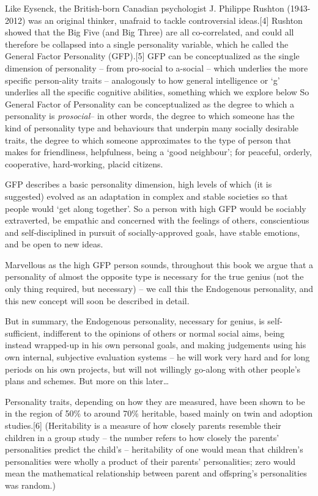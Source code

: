 \documentclass[
]{book}
\begin{document}
Like Eysenck, the British-born Canadian psychologist J. Philippe Rushton (1943-2012) was an original thinker, unafraid to tackle controversial ideas.{[}4{]} Rushton showed that the Big Five (and Big Three) are all co-correlated, and could all therefore be collapsed into a single personality variable, which he called the General Factor Personality (GFP).{[}5{]} GFP can be conceptualized as the single dimension of personality -- from pro-social to a-social -- which underlies the more specific person-ality traits -- analogously to how general intelligence or `g' underlies all the specific cognitive abilities, something which we explore below
So General Factor of Personality can be conceptualized as the degree to which a personality is \emph{prosocial}-- in other words, the degree to which someone has the kind of personality type and behaviours that underpin many socially desirable traits, the degree to which someone approximates to the type of person that makes for friendliness, helpfulness, being a `good neighbour'; for peaceful, orderly, cooperative, hard-working, placid citizens.

GFP describes a basic personality dimension, high levels of which (it is suggested) evolved as an adaptation in complex and stable societies so that people would `get along together'. So a person with high GFP would be sociably extraverted, be empathic and concerned with the feelings of others, conscientious and self-disciplined in pursuit of socially-approved goals, have stable emotions, and be open to new ideas.

Marvellous as the high GFP person sounds, throughout this book we argue that a personality of almost the opposite type is necessary for the true genius (not the only thing required, but necessary) -- we call this the Endogenous personality, and this new concept will soon be described in detail.

But in summary, the Endogenous personality, necessary for genius, is self-sufficient, indifferent to the opinions of others or normal social aims, being instead wrapped-up in his own personal goals, and making judgements using his own internal, subjective evaluation systems -- he will work very hard and for long periods on his own projects, but will not willingly go-along with other people's plans and schemes. But more on this later\ldots{}

Personality traits, depending on how they are measured, have been shown to be in the region of 50\% to around 70\% heritable, based mainly on twin and adoption studies.{[}6{]} (Heritability is a measure of how closely parents resemble their children in a group study -- the number refers to how closely the parents' personalities predict the child's -- heritability of one would mean that children's personalities were wholly a product of their parents' personalities; zero would mean the mathematical relationship between parent and offspring's personalities was random.)
\end{document}
